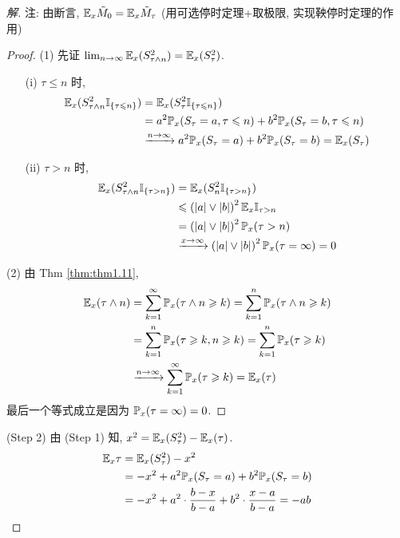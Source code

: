 \begin{proof}[解]
注: 由断言, $\mathbb E_x \tilde{M}_0=\mathbb E_x \tilde{M}_{\tau}$ (用可选停时定理+取极限, 实现鞅停时定理的作用)
\begin{proof}
    (1) 先证 $\lim_{n \to \infty}\mathbb E_x(S_{\tau\land n}^2)=\mathbb E_x(S_{\tau}^2)$.
    \begin{enumerate}
        \item[(i)] $\tau\leq n$ 时,
        \[
        \begin{aligned}
            \mathbb E_x(S_{\tau\land n}^2\mathbb I_{\{\tau\leqslant n\}}) &=\mathbb E_x(S_{\tau}^2\mathbb I_{\{\tau\leqslant n\}})\\
            &=a^2\mathbb{P}_x(S_{\tau}=a,\tau\leqslant n)+b^2\mathbb{P}_x(S_{\tau}=b,\tau\leqslant n)\\
            &\xrightarrow{n\to\infty}a^2\mathbb{P}_x(S_{\tau}=a)+b^2\mathbb{P}_x(S_{\tau}=b)=\mathbb E_x(S_{\tau})
        \end{aligned}
        \]
        \item[(ii)] $\tau>n$ 时,
        \[
        \begin{aligned}
        \mathbb E_x(S_{\tau\land n}^2\mathbb I_{\{\tau>n\}}) &=\mathbb E_x(S_n^2\mathbb I_{\{\tau>n\}})\\
        &\leqslant \left(|a|\lor |b|\right)^2 \mathbb E_x\mathbb I_{\tau>n}\\
        &=\left(|a|\lor |b|\right)^2 \mathbb{P}_x(\tau>n)\\
        &\xrightarrow{x\to\infty}\left(|a|\lor |b|\right)^2 \mathbb{P}_x(\tau=\infty)=0
        \end{aligned}
        \]
    \end{enumerate}
    (2) 由 Thm \ref{thm:thm1.11},
    \[
    \begin{aligned}
        \mathbb E_x(\tau\land n)&=\sum_{k=1}^{\infty} \mathbb{P}_x(\tau\land n\geqslant k)=\sum_{k=1}^{n}\mathbb{P}_x(\tau\land n\geqslant k)\\
        &=\sum_{k=1}^{n}\mathbb{P}_x(\tau\geqslant k,n\geqslant k)=\sum_{k=1}^n\mathbb{P}_x(\tau\geqslant k)\\
        &\xrightarrow{n\to\infty}\sum_{k=1}^{\infty}\mathbb{P}_x(\tau\geqslant k)=\mathbb E_x(\tau)
    \end{aligned}
    \]
    最后一个等式成立是因为 $\mathbb{P}_x(\tau=\infty)=0$.
\end{proof}

(Step 2) 由 (Step 1) 知, $x^2=\mathbb E_x(S_{\tau}^2)-\mathbb E_x(\tau)$.
\[
\begin{aligned}
    \mathbb E_x\tau &=\mathbb E_x(S_{\tau}^2)-x^2\\
    &=-x^2 +a^2\mathbb{P}_x(S_{\tau}=a)+b^2 \mathbb{P}_x(S_{\tau}=b)\\
    &=-x^2+a^2\cdot \frac{b-x}{b-a}+b^2\cdot \frac{x-a}{b-a}=-ab
\end{aligned}
\] 


\end{proof}
